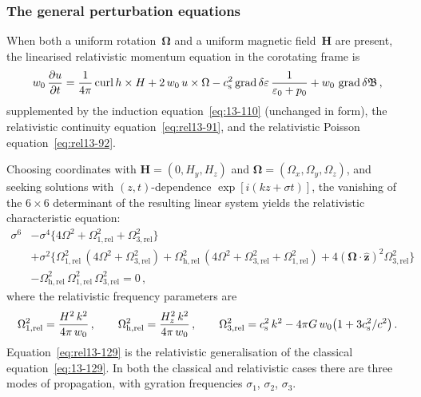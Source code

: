 \subsubsection*{The general perturbation equations}

When both a uniform rotation~$\boldsymbol{\Omega}$ and a uniform
magnetic field~$\mathbf{H}$ are present, the linearised relativistic
momentum equation in the corotating frame is
\begin{equation}
  w_{0}\,\frac{\partial u}{\partial t}
  = \frac{1}{4\pi}\operatorname{curl}h\times H
    + 2\,w_{0}\,u\times\Omega
    - c_{\mathrm{s}}^{2}\operatorname{grad}\delta\varepsilon\,
      \frac{1}{\varepsilon_{0}+p_{0}}
    + w_{0}\,\operatorname{grad}\delta\mathfrak{B}\,,
  \label{eq:rel13-126}
\end{equation}
supplemented by the induction equation~\eqref{eq:13-110} (unchanged in
form), the relativistic continuity equation~\eqref{eq:rel13-91}, and the
relativistic Poisson equation~\eqref{eq:rel13-92}.

Choosing coordinates with $\mathbf{H} = (0,H_{y},H_{z})$ and
$\boldsymbol{\Omega} = (\Omega_{x},\Omega_{y},\Omega_{z})$, and
seeking solutions with $(z,t)$-dependence $\exp[i(kz+\sigma t)]$, the
vanishing of the $6\times 6$ determinant of the resulting linear system
yields the relativistic characteristic equation:
\begin{equation}
\boxed{
\begin{split}
  \sigma^{6}
  &- \sigma^{4}\bigl\{4\Omega^{2}
    + \Omega_{\mathrm{1,rel}}^{2}
    + \Omega_{\mathrm{3,rel}}^{2}\bigr\} \\
  &+ \sigma^{2}\bigl\{
    \Omega_{\mathrm{1,rel}}^{2}\,(4\Omega^{2}
      + \Omega_{\mathrm{3,rel}}^{2})
    + \Omega_{\mathrm{h,rel}}^{2}\,(4\Omega^{2}
      + \Omega_{\mathrm{3,rel}}^{2}
      + \Omega_{\mathrm{1,rel}}^{2})
    + 4(\boldsymbol{\Omega}\cdot\hat{\mathbf{z}})^{2}
      \Omega_{\mathrm{3,rel}}^{2}
    \bigr\} \\
  &- \Omega_{\mathrm{h,rel}}^{2}\,
     \Omega_{\mathrm{1,rel}}^{2}\,
     \Omega_{\mathrm{3,rel}}^{2}
  = 0\,,
\end{split}}
  \label{eq:rel13-129}
\end{equation}
where the relativistic frequency parameters are
\begin{equation}
  \Omega_{\mathrm{1,rel}}^{2}
  = \frac{H^{2}\,k^{2}}{4\pi\,w_{0}}\,,
  \qquad
  \Omega_{\mathrm{h,rel}}^{2}
  = \frac{H_{z}^{2}\,k^{2}}{4\pi\,w_{0}}\,,
  \qquad
  \Omega_{\mathrm{3,rel}}^{2}
  = c_{\mathrm{s}}^{2}\,k^{2}
    - 4\pi G\,w_{0}\bigl(1+3c_{\mathrm{s}}^{2}/c^{2}\bigr)\,.
  \label{eq:rel13-130}
\end{equation}
Equation~\eqref{eq:rel13-129} is the relativistic generalisation of the
classical equation~\eqref{eq:13-129}.  In both the classical and
relativistic cases there are three modes of propagation, with gyration
frequencies $\sigma_{1}$, $\sigma_{2}$, $\sigma_{3}$.


